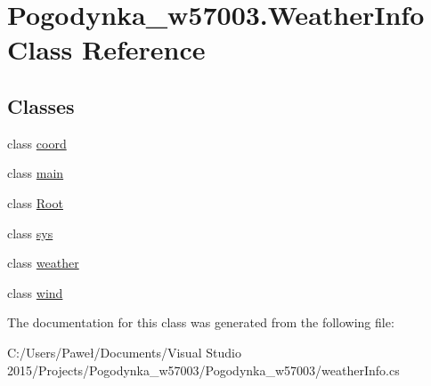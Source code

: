 \hypertarget{class_pogodynka__w57003_1_1_weather_info}{}\section{Pogodynka\+\_\+w57003.\+Weather\+Info Class Reference}
\label{class_pogodynka__w57003_1_1_weather_info}
\subsection*{Classes}
\begin{DoxyCompactItemize}
\item 
class \mbox{\hyperlink{class_pogodynka__w57003_1_1_weather_info_1_1coord}{coord}}
\item 
class \mbox{\hyperlink{class_pogodynka__w57003_1_1_weather_info_1_1main}{main}}
\item 
class \mbox{\hyperlink{class_pogodynka__w57003_1_1_weather_info_1_1_root}{Root}}
\item 
class \mbox{\hyperlink{class_pogodynka__w57003_1_1_weather_info_1_1sys}{sys}}
\item 
class \mbox{\hyperlink{class_pogodynka__w57003_1_1_weather_info_1_1weather}{weather}}
\item 
class \mbox{\hyperlink{class_pogodynka__w57003_1_1_weather_info_1_1wind}{wind}}
\end{DoxyCompactItemize}


The documentation for this class was generated from the following file\+:\begin{DoxyCompactItemize}
\item 
C\+:/\+Users/\+Paweł/\+Documents/\+Visual Studio 2015/\+Projects/\+Pogodynka\+\_\+w57003/\+Pogodynka\+\_\+w57003/weather\+Info.\+cs\end{DoxyCompactItemize}

